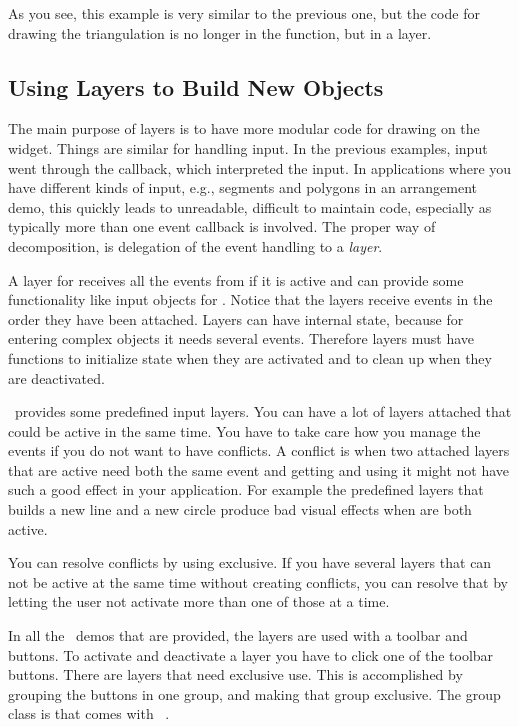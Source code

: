 As you see, this example is very similar to the previous one, but
the code for drawing the triangulation is no longer in the
 function, but in a layer.



\subsection{Using Layers to Build New Objects }
\label{Qt_widget_tools}

The main purpose of layers is to have more modular code for drawing on
the widget. Things are similar for handling input. In the previous
examples, input went through the 
callback, which interpreted the input. In applications where you have
different kinds of input, e.g., segments and polygons in an
arrangement demo, this quickly leads to unreadable, difficult to maintain
code,  especially as typically more than one event callback is
involved. The proper way of decomposition, is delegation
of the event handling to a {\em layer}. 

A layer for  receives all the events from
 if it is active and can provide some functionality
like input objects for . Notice that the layers
receive events in the order they have been attached. Layers can have
internal state, because for entering complex objects it needs several
events. Therefore layers must have functions to initialize state when
they are activated and to clean up when they are deactivated.

\cgal\ provides some predefined input layers. You can have a lot of
layers attached that could be active in the same time. You have to
take care how you manage the events if you do not want to have
conflicts. A conflict is when two attached layers that are active need 
both the same event and getting and using it might not have such a
good effect in your application. For example the predefined layers that 
builds a new line and a new circle produce bad visual effects when are 
both active.

You can resolve conflicts by using  exclusive. If you have 
several layers that can not be active at the same time without creating
conflicts, you can resolve that by letting the user not activate
more than one of those at a time.

\begin{ccAdvanced}
In all the \cgal\ demos that are provided, the layers are used with a
toolbar and buttons. To activate and deactivate a layer you have to
click one of the toolbar buttons. There are layers that need exclusive 
use. This is accomplished by grouping the buttons in one group, and
making that group exclusive. The group class is  that
comes with \qt\ .
\end{ccAdvanced}

